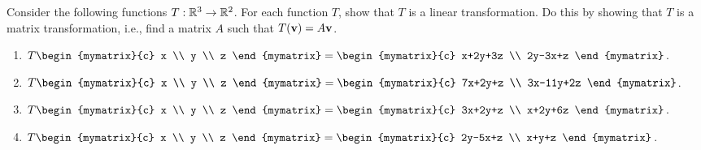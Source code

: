 \begin{ex}
  Consider the following functions $T:\mathbb{R}^3\rightarrow \mathbb{R}^2$. For
  each function $T$, show that $T$ is a linear transformation. Do this
  by showing that $T$ is a matrix transformation, i.e., find a matrix
  $A$ such that $T(\vect{v})=A\vect{v}$.
  \begin{enumerate}
  \item $T\begin{mymatrix}{c} x \\ y \\ z \end{mymatrix}
    = \begin{mymatrix}{c}
      x+2y+3z \\
      2y-3x+z
    \end{mymatrix}$.
  \item $T\begin{mymatrix}{c} x \\ y \\ z \end{mymatrix}
    = \begin{mymatrix}{c}
      7x+2y+z \\
      3x-11y+2z
    \end{mymatrix}$.
  \item $T\begin{mymatrix}{c} x \\ y \\ z \end{mymatrix}
    = \begin{mymatrix}{c}
      3x+2y+z \\
      x+2y+6z
    \end{mymatrix}$.
  \item $T\begin{mymatrix}{c} x \\ y \\ z \end{mymatrix}
    = \begin{mymatrix}{c}
      2y-5x+z \\
      x+y+z
    \end{mymatrix}$.
  \end{enumerate}
\end{ex}

